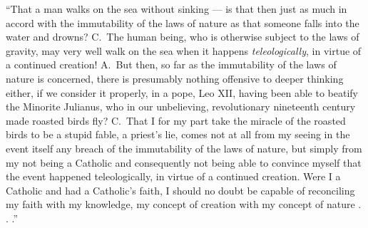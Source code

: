 \documentclass[12pt,a4paper]{book}
\begin{document}
``That a man walks on the sea without sinking --- is that then just as much in
accord with the immutability of the laws of nature as that someone falls into
the water and drowns? C.\ The human being, who is otherwise subject to the laws
of gravity, may very well walk on the sea when it happens
\emph{teleologically}, in virtue of a continued creation! A.\ But then, so far
as the immutability of the laws of nature is concerned, there is presumably
nothing offensive to deeper thinking either, if we consider it properly, in a
pope, Leo XII, having been able to beatify the Minorite Julianus, who in our
unbelieving, revolutionary nineteenth century made roasted birds fly? C.\ That
I for my part take the miracle of the roasted birds to be a stupid fable, a
priest's lie, comes not at all from my seeing in the event itself any breach of
the immutability of the laws of nature, but simply from my not being a Catholic
and consequently not being able to convince myself that the event happened
teleologically, in virtue of a continued creation. Were I a Catholic and had a
Catholic's faith, I should no doubt be capable of reconciling my faith with my
knowledge, my concept of creation with my concept of nature . . .''
\end{document}
